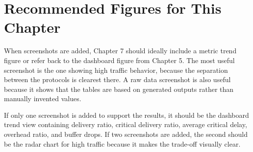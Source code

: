 \section{Recommended Figures for This Chapter}
When screenshots are added, Chapter 7 should ideally include a metric trend figure or refer back to the dashboard figure from Chapter 5. The most useful screenshot is the one showing high traffic behavior, because the separation between the protocols is clearest there. A raw data screenshot is also useful because it shows that the tables are based on generated outputs rather than manually invented values.

If only one screenshot is added to support the results, it should be the dashboard trend view containing delivery ratio, critical delivery ratio, average critical delay, overhead ratio, and buffer drops. If two screenshots are added, the second should be the radar chart for high traffic because it makes the trade-off visually clear.
